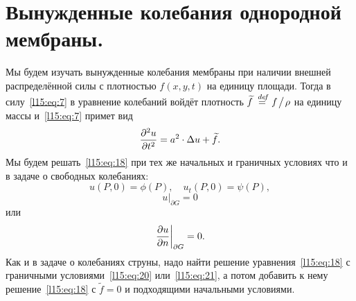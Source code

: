 \section{Вынужденные колебания однородной мембраны.}
\label{lecture15section2}
Мы будем изучать вынужденные колебания мембраны при наличии внешней распределённой силы с плотностью $f(x,y,t)$ на единицу площади. Тогда в силу~\eqref{l15:eq:7} в уравнение колебаний войдёт плотность $\widetilde{f}\stackrel{\hspace{0.09 cm}de\!f}{=} f\!\bigm/\!\rho$ на единицу массы и~\eqref{l15:eq:7} примет вид
\begin{equation}\label{l15:eq:18}
	\frac{\partial^2u}{\partial t^2}=a^2\cdot\Delta u+\widetilde{f}.
\end{equation}
Мы будем решать~\eqref{l15:eq:18} при тех же начальных и граничных условиях что и в задаче о свободных колебаниях:
\begin{equation}\label{l15:eq:19}
	 u(P,0)=\phi(P),\quad u_t(P,0)=\psi(P),
\end{equation} 
\begin{equation}\label{l15:eq:20}
	 u\Big|_{\partial G}=0
\end{equation} 
или
\begin{equation}\label{l15:eq:21}
	 \left. \frac{\partial u}{\partial n}\right|_{\partial G}=0.
\end{equation} 
Как и в задаче о колебаниях струны, надо найти решение уравнения~\eqref{l15:eq:18} с граничными условиями~\eqref{l15:eq:20} или~\eqref{l15:eq:21}, а потом добавить к нему решение~\eqref{l15:eq:18} с $\widetilde{f}=0$ и подходящими начальными условиями.

